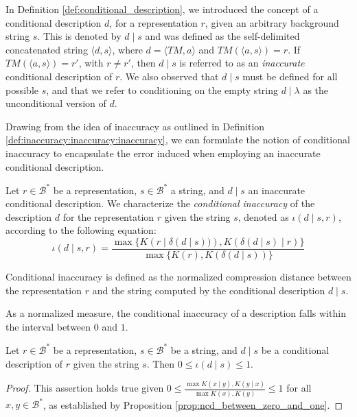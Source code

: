 In Definition \ref{def:conditional_description}, we introduced the concept of a conditional description $d$, for a representation $r$, given an arbitrary background string $s$. This is denoted by $d \mid s$ and was defined as the self-delimited concatenated string $\langle d, s \rangle$, where $d = \langle TM, a \rangle$ and $TM \left(\langle a, s \rangle \right) = r$. If $TM \left(\langle a, s \rangle \right) = r'$, with $r \neq r'$, then $d \mid s$ is referred to as an \emph{inaccurate} conditional description of $r$. We also observed that $d \mid s$ must be defined for all possible $s$, and that we refer to conditioning on the empty string $d \mid \lambda$ as the unconditional version of $d$.

Drawing from the idea of inaccuracy as outlined in Definition \ref{def:inaccuracy:inaccuracy:inaccuracy}, we can formulate the notion of conditional inaccuracy to encapsulate the error induced when employing an inaccurate conditional description.

\begin{definition}
Let $r \in \mathcal{B}^\ast$ be a representation, $s \in \mathcal{B}^\ast$ a string, and $d \mid s$ an inaccurate conditional description. We characterize the \emph{conditional inaccuracy} of the description $d$ for the representation $r$ given the string $s$, denoted as $\iota(d \mid s, r)$, according to the following equation:
\[
\iota(d \mid s, r) = \frac{ \max\{ K \left(r \mid \delta(d \mid s) ) \right), K \left( \delta(d \mid s) \mid r \right) \} } { \max\{ K(r), K \left( \delta(d \mid s) \right) \} }
\]
\end{definition}

Conditional inaccuracy is defined as the normalized compression distance between the representation $r$ and the string computed by the conditional description $d \mid s$.

As a normalized measure, the conditional inaccuracy of a description falls within the interval between $0$ and $1$.

\begin{proposition}
\label{prop:range_conditional_inaccuracy}
Let $r \in \mathcal{B}^\ast$ be a representation, $s \in \mathcal{B}^\ast$ be a string, and $d \mid s$ be a conditional description of $r$ given the string $s$. Then $0 \leq \iota(d \mid s) \leq 1$.
\end{proposition}
\begin{proof}
This assertion holds true given $0 \leq \frac{ \max{ K(x \mid y), K(y \mid x) } } { \max{ K(x), K(y) } } \leq 1$ for all $x, y \in \mathcal{B}^\ast$, as established by Proposition \ref{prop:ncd_between_zero_and_one}.
\end{proof}

